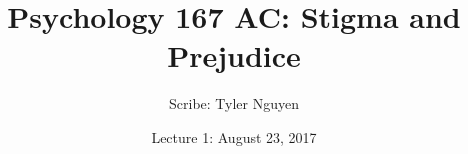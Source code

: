 \documentclass{article}
\begin{document}
\title{Psychology 167 AC: Stigma and Prejudice}
\author{Scribe: Tyler Nguyen}
\date{Lecture 1: August 23, 2017}
\maketitle
\end{document}
